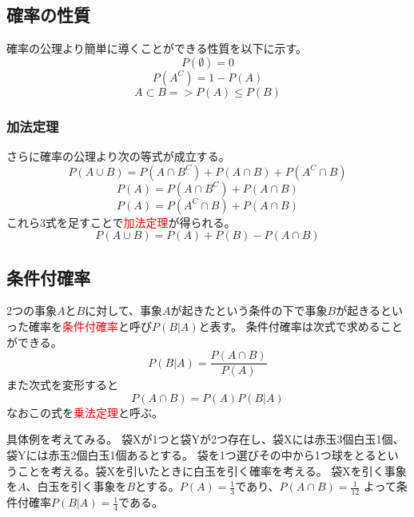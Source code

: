 \documentclass[a4paper,10pt]{jarticle}
\begin{document}
\subsection{確率の性質}
確率の公理より簡単に導くことができる性質を以下に示す。
\begin{equation}
    P(\emptyset)=0\tag{1,12}
\end{equation}
\begin{equation}
    P(A^C)= 1-P(A)\tag{1,13}
\end{equation}
\begin{equation}
    A\subset B => P(A) \leq P(B)\tag{1,14}
\end{equation}
\subsubsection{加法定理}
さらに確率の公理より次の等式が成立する。
\begin{equation}
    P(A\cup B) = P(A\cap B^C) +P(A\cap B )+ P(A^C\cap B)\tag{1,15}
\end{equation}
\begin{equation}
    P(A) = P(A\cap B^C) +P(A\cap B)\tag{1,16}
\end{equation}
\begin{equation}
    P(A) = P(A^C\cap B) + P(A\cap B)\tag{1,17}
\end{equation}
これら3式を足すことで\textcolor{red}{加法定理}が得られる。
\begin{equation}
    P(A\cup B )= P(A)+P(B)-P(A\cap B)\tag{1,18}
\end{equation}
\subsection{条件付確率}
2つの事象$A$と$B$に対して、事象$A$が起きたという条件の下で事象$B$が起きるといった確率を\textcolor{red}{条件付確率}と呼び$P(B|A)$と表す。
条件付確率は次式で求めることができる。
\begin{equation}
    P(B|A)=\frac{P(A\cap B)}{P(A)}\tag{1,19}
\end{equation}
また次式を変形すると
\begin{equation}
    P(A\cap B)=P(A)P(B|A)\tag{1,20}
\end{equation}
なおこの式を\textcolor{red}{乗法定理}と呼ぶ。

具体例を考えてみる。
袋Xが1つと袋Yが2つ存在し、袋Xには赤玉3個白玉1個、袋Yには赤玉2個白玉1個あるとする。
袋を1つ選びその中から1つ球をとるということを考える。袋Xを引いたときに白玉を引く確率を考える。
袋Xを引く事象を$A$、白玉を引く事象を$B$とする。$P(A)=\frac{1}{3}$であり、$P(A\cap B)=\frac{1}{12}$
よって条件付確率$P(B|A)=\frac{1}{4}$である。
\end{document}
